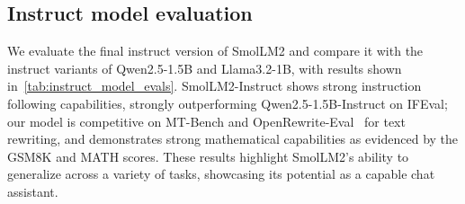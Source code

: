 \documentclass{article}
\theoremstyle{plain}
\theoremstyle{definition}
\theoremstyle{remark}
\begin{document}
\vspace{-0.1cm}
\subsection{Instruct model evaluation}
\vspace{-0.1cm}
\label{sec:evaluation_smollm2}
We evaluate the final instruct version of SmolLM2 and compare it with the instruct variants of Qwen2.5-1.5B and Llama3.2-1B, with results shown in~\cref{tab:instruct_model_evals}. 
SmolLM2-Instruct shows strong instruction following capabilities, strongly outperforming Qwen2.5-1.5B-Instruct on IFEval; our model is competitive on MT-Bench and OpenRewrite-Eval~\cite{shu2024rewritelm} for text rewriting, and demonstrates strong mathematical capabilities as evidenced by the GSM8K and MATH scores. These results highlight SmolLM2's ability to generalize across a variety of tasks, showcasing its potential as a capable chat assistant.

\begin{table}[t]
\caption{Comparison of 1-2B \textbf{instruction-tuned models} across benchmarks. SmolLM2-1.7B-Instruct exhibits strong performance in instruction-following, reasoning, and math.}
\label{tab:instruct_model_evals}
\vspace{0.5em}
\vspace{-1em}
\end{table}
\end{document}
